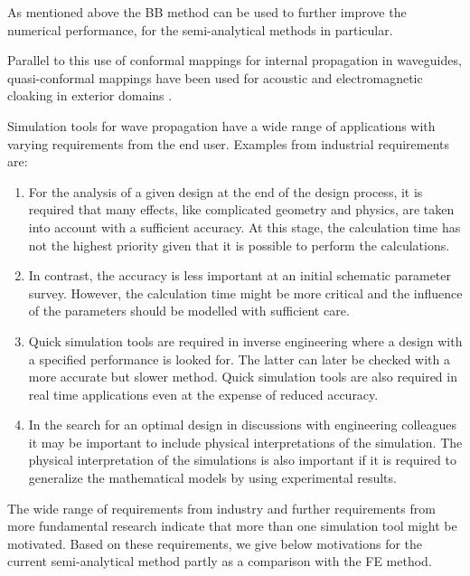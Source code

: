 \documentclass[numreferences]{kluwer}
\begin{document}
As mentioned above the BB method can be used to further improve the numerical performance, for the semi-analytical methods in particular.

Parallel to this use of conformal mappings for internal propagation in waveguides,
quasi-conformal mappings have been used for acoustic and electromagnetic cloaking in exterior domains
\cite{pendryschurigsmith2006}.

Simulation tools for wave propagation have a wide range of
applications with varying requirements from the end user. Examples
from industrial requirements are:
\begin{enumerate}
\item For the analysis of a given design at the end of the design
  process, it is required that many effects, like complicated geometry
  and physics, are taken into account with a sufficient accuracy. At
  this stage, the calculation time has not the highest priority given
  that it is possible to perform the calculations.
\item In contrast, the accuracy is less important at an initial
  schematic parameter survey. However, the calculation time might be
  more critical and the influence of the parameters should be modelled with sufficient care.
 \item Quick simulation tools are required in inverse engineering where
  a design with a specified performance is looked for. The latter can
  later be checked with a more accurate but slower method. Quick simulation tools are also required in real time
  applications even at the expense of reduced accuracy. 
\item In the search for an optimal design in discussions with
  engineering colleagues it may be important to include physical
  interpretations of the simulation. The physical interpretation of the simulations is also important
  if it is required to generalize the mathematical models by using
  experimental results.

\end{enumerate}

The wide range of requirements from industry and further requirements from more fundamental research indicate that more than
one simulation tool might be motivated. Based on these requirements, we
give below motivations for the current semi-analytical method partly
as a comparison with the FE method.
\end{document}

